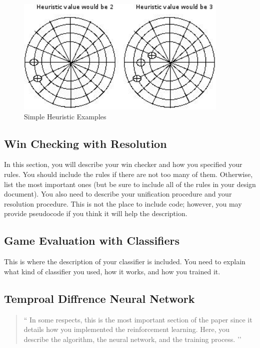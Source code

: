 \documentclass[12pt,letterpaper]{article}
\begin{document}
\begin{figure}
\begin{center}
\includegraphics[width=4in]{heu.png}
\end{center}
\caption{Simple Heuristic Examples}
\label{somefigure}
\end{figure}

\subsection{Win Checking with Resolution}
In this section, you will describe your win checker and how you specified your rules. 
You should include the rules if there are not too many of them. Otherwise, list the most important
ones (but be sure to include all of the rules in your design document). You also need to describe 
your unification procedure and your resolution procedure. This is not the place to include code; 
however, you may provide pseudocode if you think it will help the description.

\subsection{Game Evaluation with Classifiers}
This is where the description of your classifier is included. You need to explain what kind of
classifier you used, how it works, and how you trained it.

\subsection{Temproal Diffrence Neural Network}
\begin{quote}
`` 
In some respects, this is the most important section of the paper since it details how
you implemented the reinforcement learning. Here, you describe the algorithm, the
neural network, and the training process.
’’
\end{quote}
\end{document}
